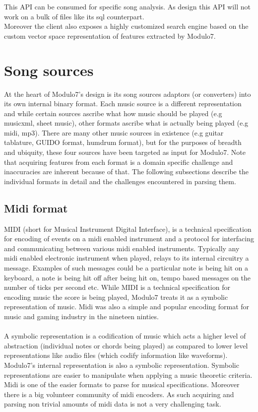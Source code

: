 \noindent This API can be consumed for specific song analysis. As design this API will not work on a bulk of files like its sql counterpart. \\

Moreover the client also exposes a highly customized search engine based on the custom vector space representation of features extracted by Modulo7.

\section{Song sources}
\noindent At the heart of Modulo7's design is its song sources adaptors (or converters) into its own internal binary format. Each music source is a different representation and while certain sources ascribe what how music should be played (e.g musicxml, sheet music), other formats ascribe what is actually being played (e.g midi, mp3). There are many other music sources in existence (e.g guitar tablature, GUIDO format, humdrum format), but for the purposes of breadth and ubiquity, these four sources have been targeted as input for Modulo7. Note that acquiring features from each format is a domain specific challenge and inaccuracies are inherent because of that. The following subsections describe the individual formats in detail and the challenges encountered in parsing them.

\subsection{Midi format}
\noindent MIDI (short for Musical Instrument Digital Interface), is a technical specification for encoding of events on a midi enabled instrument and a protocol for interfacing and communicating between various midi enabled instruments. Typically any midi enabled electronic instrument when played, relays to its internal circuitry a message. Examples of such messages could be a particular note is being hit on a keyboard, a note is being hit off after being hit on, tempo based messages on the number of ticks per second etc. While MIDI is a technical specification for encoding music the score is being played, Modulo7 treats it as a symbolic representation of music. Midi was also a simple and popular encoding format for music and gaming industry in the nineteen ninties. \\\\
A symbolic representation is a codification of music which acts a higher level of abstraction (individual notes or chords being played) as compared to lower level representations like audio files (which codify information like waveforms). Modulo7's internal representation is also a symbolic representation. Symbolic representations are easier to manipulate when applying a music theoretic criteria. \\
Midi is one of the easier formats to parse for musical specifications. Moreover there is a big volunteer community of midi encoders. As such acquiring and parsing non trivial amounts of midi data is not a very challenging task. 

